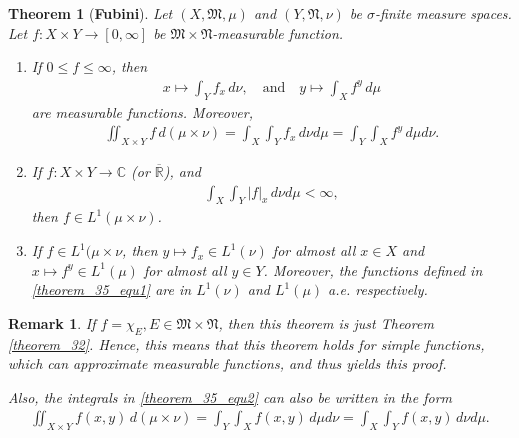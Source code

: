 \documentclass[11pt]{book}
\newtheorem{theorem}{Theorem}[chapter]
\newtheorem{remark}{Remark}[chapter]
\theoremstyle{definition}
\numberwithin{equation}{chapter}
\begin{document}
\begin{theorem}[{\bf Fubini}]\label{theorem_35}
Let $(X,\mathfrak{M},\mu)$ and $(Y,\mathfrak{N},\nu)$ be $\sigma$-finite measure spaces. Let $f: X \times Y \to [0,\infty]$ be $\mathfrak{M} \times \mathfrak{N}$-measurable function.
\begin{enumerate}[label=(\alph*)]
    \item If $0 \leq f \leq \infty$, then 
    \begin{align}\label{theorem_35_equ1}
        x \mapsto \int_Y f_x\, d\nu, \quad \text{and} \quad y \mapsto \int_X f^y\, d\mu
    \end{align}
    are measurable functions. Moreover,
    \begin{align}\label{theorem_35_equ2}
        \iint_{X \times Y} f\,d(\mu\times\nu)  = \int_X \int_Y f_x \, d\nu d\mu = \int_Y \int_X f^y \, d\mu d\nu.
    \end{align}
    
    \item If $f: X \times Y \to \mathbb{C}$ (or $\overline{\mathbb{R}}$), and
    \begin{align*}
        \int_X \int_Y \left|f\right|_x \, d\nu d\mu < \infty,
    \end{align*}
    then $f \in L^1(\mu \times \nu)$.
    
    \item If $f \in L^1(\mu \times \nu$, then $y \mapsto f_x \in L^1(\nu)$ for almost all $x\in X$ and $x \mapsto f^y \in L^1(\mu)$ for almost all $y \in Y$. Moreover, the functions defined in \eqref{theorem_35_equ1} are in $L^1(\nu)$ and $L^1(\mu)$ a.e. respectively.
\end{enumerate}

\end{theorem}

\begin{remark}
If $f = \chi_E, E \in \mathfrak{M} \times \mathfrak{N}$, then this theorem is just Theorem \ref{theorem_32}. Hence, this means that this theorem holds for simple functions, which can approximate measurable functions, and thus yields this proof. 

Also, the integrals in \eqref{theorem_35_equ2} can also be written in the form
\begin{align*}
    \iint_{X \times Y} f(x,y)\,d(\mu\times\nu) = \int_Y \int_X f(x,y) \, d\mu d\nu = \int_X \int_Y f(x,y) \, d\nu d\mu.
\end{align*}
\end{remark}
\end{document}

